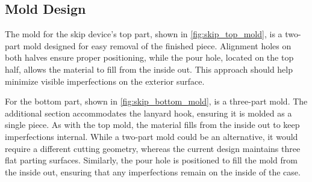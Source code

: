 \documentclass{article}
\begin{document}
\subsection{Mold Design}
The mold for the skip device's top part, shown in \autoref{fig:skip_top_mold}, is a two-part mold designed for easy removal of the finished piece. Alignment holes on both halves ensure proper positioning, while the pour hole, located on the top half, allows the material to fill from the inside out. This approach should help minimize visible imperfections on the exterior surface.

For the bottom part, shown in \autoref{fig:skip_bottom_mold}, is a three-part mold. The additional section accommodates the lanyard hook, ensuring it is molded as a single piece. As with the top mold, the material fills from the inside out to keep imperfections internal. While a two-part mold could be an alternative, it would require a different cutting geometry, whereas the current design maintains three flat parting surfaces. Similarly, the pour hole is positioned to fill the mold from the inside out, ensuring that any imperfections remain on the inside of the case.
\end{document}
